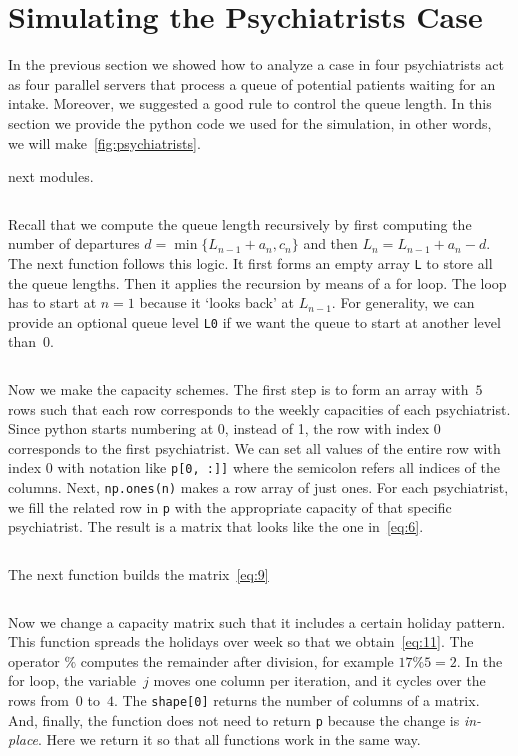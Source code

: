 \documentclass[stochastic-or.tex]{subfiles}
\begin{document}
\section{Simulating the Psychiatrists Case}
\label{sec:simul-psych-case}

In the previous section we showed how to analyze a case in four psychiatrists act as four parallel servers that process a queue of potential patients waiting for an intake.
Moreover, we suggested a good rule to control the queue length.
In this section we provide the python code we used for the simulation, in other words, we will make~\cref{fig:psychiatrists}.


 next modules.
\inputminted[firstline=2, lastline=7]{python}{../code/psychiatrists.py} %

Recall that we compute the queue length recursively by first computing the number of departures $d = \min\{L_{n-1}+a_{n}, c_{n}\}$ and then $L_{n} = L_{n-1}+a_n-d$.
The next function follows this logic.
It  first forms an empty array \texttt{L} to store all the queue lengths.
Then it applies the recursion by means of a for loop. The loop has to start at $n=1$ because it `looks back' at $L_{n-1}$.
For generality, we can provide an optional queue level \texttt{L0} if we want the queue to start at another level than~$0$.
\inputminted[firstline=30, lastline=37]{python}{../code/psychiatrists.py} %


Now we make the capacity schemes.
The first step is to form an array with~$5$ rows such that each row corresponds to the weekly capacities of each psychiatrist.
Since python starts numbering at 0, instead of 1, the row with index 0 corresponds to the first psychiatrist.
We can set all values of the entire row with index 0 with notation like \texttt{p[0, :]]} where the semicolon refers all indices of the columns. Next, \texttt{np.ones(n)} makes a row array of just ones. For each psychiatrist, we fill the related row in \texttt{p} with the appropriate capacity of that specific psychiatrist. The result is a matrix that looks like the one in~\cref{eq:6}.
\inputminted[firstline=60, lastline=67]{python}{../code/psychiatrists.py} %

The next function builds the matrix~\cref{eq:9}
\inputminted[firstline=74, lastline=81]{python}{../code/psychiatrists.py} %

Now we change a capacity matrix such that it includes a certain holiday pattern.
This function spreads the holidays over week so that we obtain~\cref{eq:11}.
The operator $\%$ computes the remainder after division, for example $ 17 \% 5 = 2$.
In the for loop, the variable~$j$ moves one column per iteration, and it cycles over the rows from~$0$ to~$4$.
The \texttt{shape[0]} returns the number of columns of a matrix.
And, finally, the function does not need to return \texttt{p} because the change is \emph{in-place}. Here we return it so that all functions work in the same way.
\inputminted[firstline=88, lastline=92]{python}{../code/psychiatrists.py} %
\end{document}
